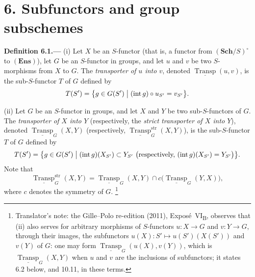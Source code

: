 
\begingroup
\renewcommand{\thefootnote}{*}%
\section*{6. Subfunctors and group subschemes%
  \texorpdfstring{\protect\footnotemark}{}}
\endgroup
{}\label{sec:sga3-VIB-6}%

\medskip
{}\label{def:sga3-VIB-6.1}%
\noindent\textbf{Definition 6.1.---}
\textup{(i)} Let \(X\) be an \(S\)-functor (that is, a functor
from \((\mathbf{Sch}/S)^\circ\) to \((\mathbf{Ens})\)), let \(G\)
be an \(S\)-functor in groups, and let \(u\) and \(v\) be two
\(S\)-morphisms from \(X\) to \(G\). The \emph{transporter of
\(u\) into \(v\)}, denoted
\(\underline{\operatorname{Transp}}(u,v)\), is the
sub-\(S\)-functor \(T\) of \(G\) defined by
\[
  T(S')=\bigl\{g\in G(S')\bigm|(\operatorname{int}g)\circ u_{S'}=v_{S'}\bigr\}.
\]

\smallskip
\noindent\textup{(ii)} Let \(G\) be an \(S\)-functor in groups,
and let \(X\) and \(Y\) be two sub-\(S\)-functors of \(G\). The
\emph{transporter of \(X\) into \(Y\)} (respectively, the
\emph{strict transporter of \(X\) into \(Y\)}), denoted
\(\underline{\operatorname{Transp}}_G(X,Y)\) (respectively,
\(\underline{\operatorname{Transp}}^{\mathrm{str}}_G(X,Y)\)),
is the sub-\(S\)-functor \(T\) of \(G\) defined by
\[
  T(S')=\bigl\{g\in G(S')\bigm|(\operatorname{int}g)(X_{S'})\subset Y_{S'}\
  \bigl(\text{respectively, }(\operatorname{int}g)(X_{S'})=Y_{S'}\bigr)\bigr\}.
\]
Note that
\label{eq:sga3-VIB-6.1-inversion}%
\[
\underline{\operatorname{Transp}}^{\mathrm{str}}_G(X,Y)
 =
\underline{\operatorname{Transp}}_G(X,Y)
 \cap
c\bigl(\underline{\operatorname{Transp}}_G(Y,X)\bigr),
\]
where \(c\) denotes the symmetry of \(G\).%
\footnote{Translator's note: the Gille--Polo re-edition (2011), Expos\'e~VI\textsubscript{B}, observes
that (ii) also serves for arbitrary morphisms of \(S\)-functors \(u\colon X\to G\) and \(v\colon Y\to G\), through
their images, the subfunctors \(u(X)\colon S'\mapsto u(S')(X(S'))\) and \(v(Y)\) of \(G\): one may form
\(\underline{\operatorname{Transp}}_G(u(X),v(Y))\), which is \(\underline{\operatorname{Transp}}_G(X,Y)\) when
\(u\) and \(v\) are the inclusions of subfunctors; it states 6.2 below, and 10.11, in these terms.}

